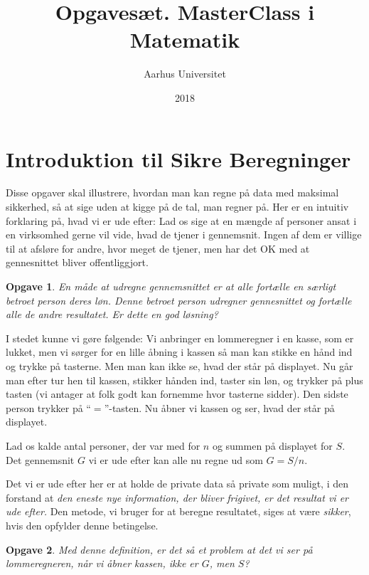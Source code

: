 \documentclass{article}
\theoremstyle{opgavedd}
\newtheorem{opgave}{Opgave}[section]
\begin{document}
\title{Opgavesæt. MasterClass i Matematik}
\author{Aarhus Universitet}
\date{2018}
\maketitle

\section{Introduktion til Sikre Beregninger}
Disse opgaver skal illustrere, hvordan man kan regne på data med maksimal sikkerhed, så at
sige uden at kigge på de tal, man regner på. Her er en intuitiv forklaring på, hvad vi er
ude efter: Lad os sige at en mængde af personer ansat i en virksomhed gerne vil vide, hvad
de tjener i gennemsnit. Ingen af dem er villige til at afsløre for andre, hvor meget de
tjener, men har det OK med at gennesnittet bliver offentliggjort.

\begin{opgave}
  En måde at udregne gennemsnittet er at alle fortælle en særligt betroet person deres
  løn. Denne betroet person udregner gennesnittet og fortælle alle de andre
  resultatet. Er dette en god løsning?
\end{opgave}

I stedet kunne vi gøre følgende: Vi anbringer en lommeregner i en kasse, som er lukket,
men vi sørger for en lille åbning i kassen så man kan stikke en hånd ind og trykke på
tasterne. Men man kan ikke se, hvad der står på displayet. Nu går man efter tur hen til
kassen, stikker hånden ind, taster sin løn, og trykker på plus tasten (vi antager at folk
godt kan fornemme hvor tasterne sidder). Den sidste person trykker på ``$=$''-tasten. Nu
åbner vi kassen og ser, hvad der står på displayet.

Lad os kalde antal personer, der var med for $n$ og summen på displayet for $S$. Det
gennemsnit $G$ vi er ude efter kan alle nu regne ud som $G=S/n$.

Det vi er ude efter her er at holde de private data så private som muligt, i den forstand
at \emph{den eneste nye information, der bliver frigivet, er det resultat vi er ude
  efter.} Den metode, vi bruger for at beregne resultatet, siges at være \emph{sikker},
hvis den opfylder denne betingelse.

\begin{opgave}
  Med denne definition, er det så et problem at det vi ser på lommeregneren, når vi åbner
  kassen, ikke er $G$, men $S$?
\end{opgave}
\end{document}
